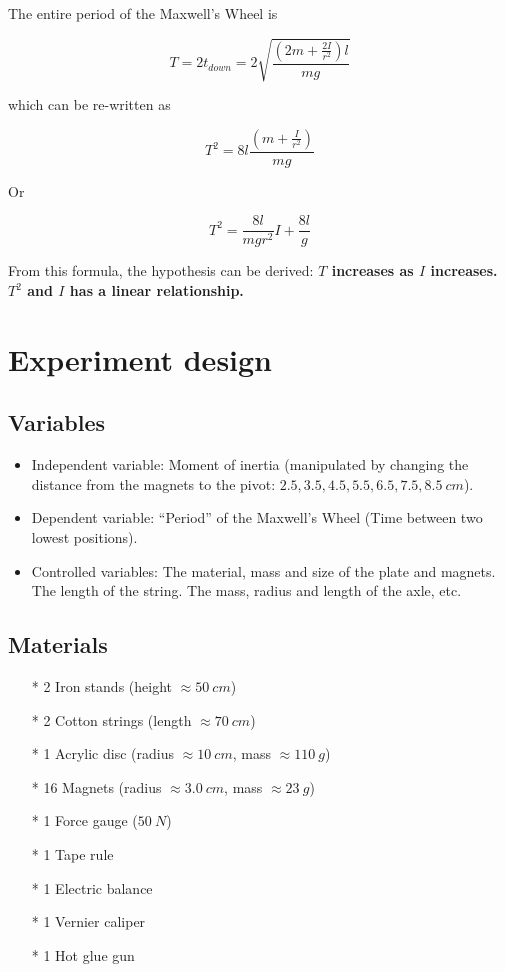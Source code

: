 \documentclass[a4paper]{article}
\begin{document}
The entire period of the Maxwell's Wheel is 

\begin{equation}
    T = 2t_{down} = 2\sqrt{\dfrac{(2m+\frac{2I}{r^2})l}{mg}}
\end{equation}

which can be re-written as 

\begin{equation}
    T^2 = 8l\dfrac{(m+\frac{I}{r^2})}{mg}
\end{equation}

Or

\begin{equation}
    T^2 = \dfrac{8l}{mgr^2} I + \dfrac{8l}{g}
\end{equation}

From this formula, the hypothesis can be derived: \textbf{$T$ increases as $I$ increases. $T^2$ and $I$ has a linear relationship.}

\section{Experiment design}

\subsection{Variables} 

\begin{itemize}
    \item Independent variable: Moment of inertia (manipulated by changing the distance from the magnets to the pivot: $2.5, 3.5, 4.5, 5.5, 6.5, 7.5, 8.5 \SI{}{cm}$).
    \item Dependent variable: ``Period'' of the Maxwell's Wheel (Time between two lowest positions).
    \item Controlled variables: The material, mass and size of the plate and magnets. The length of the string. The mass, radius and length of the axle, etc.
\end{itemize}

\subsection{Materials}

\begin{itemize}
    \item[*] 2 Iron stands (height $\approx \SI{50}{cm}$)
    \item[*] 2 Cotton strings (length $\approx \SI{70}{cm}$)
    \item[*] 1 Acrylic disc (radius $\approx \SI{10}{cm}$, mass $\approx \SI{110}{g}$)
    \item[*] 16 Magnets (radius $\approx \SI{3.0}{cm}$, mass $\approx \SI{23}{g}$)
    \item[*] 1 Force gauge ($\SI{50}{N}$)
    \item[*] 1 Tape rule
    \item[*] 1 Electric balance
    \item[*] 1 Vernier caliper
    \item[*] 1 Hot glue gun  
\end{itemize}
\end{document}
